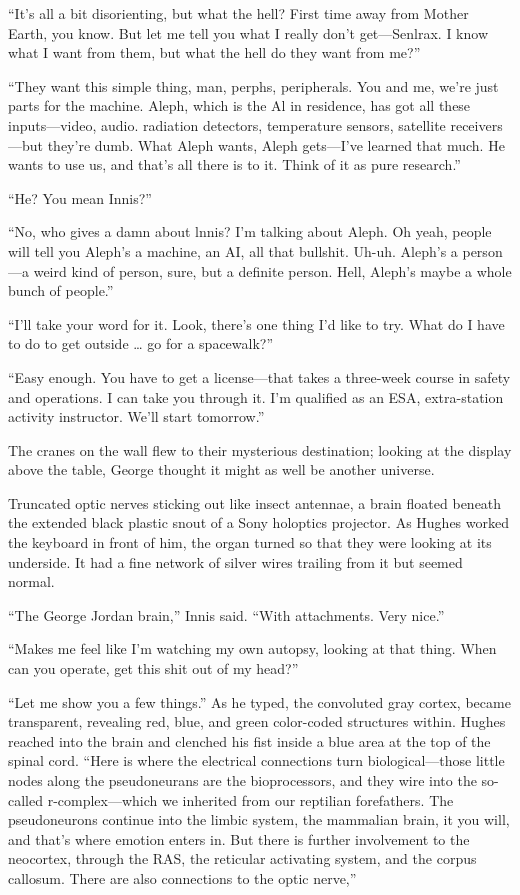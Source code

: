“It’s all a bit disorienting, but what the hell? First time away from Mother Earth, you know. But let me tell you what I really don’t get—Senlrax. I know what I want from them, but what the hell do they want from me?”

“They want this simple thing, man, perphs, peripherals. You and me, we’re just parts for the machine. Aleph, which is the Al in residence, has got all these inputs—video, audio. radiation detectors, temperature sensors, satellite receivers—but they’re dumb. What Aleph wants, Aleph gets—I’ve learned that much. He wants to use us, and that’s all there is to it. Think of it as pure research.”

“He? You mean Innis?”

“No, who gives a damn about lnnis? I’m talking about Aleph. Oh yeah, people will tell you Aleph’s a machine, an AI, all that bullshit. Uh-uh. Aleph’s a person—a weird kind of person, sure, but a definite person. Hell, Aleph’s maybe a whole bunch of people.”

“I’ll take your word for it. Look, there’s one thing I’d like to try. What do I have to do to get outside … go for a spacewalk?”

“Easy enough. You have to get a license—that takes a three-week course in safety and operations. I can take you through it. I’m qualified as an ESA, extra-station activity instructor. We’ll start tomorrow.”

The cranes on the wall flew to their mysterious destination; looking at the display above the table, George thought it might as well be another universe.

Truncated optic nerves sticking out like insect antennae, a brain floated beneath the extended black plastic snout of a Sony holoptics projector. As Hughes worked the keyboard in front of him, the organ turned so that they were looking at its underside. It had a fine network of silver wires trailing from it but seemed normal.

“The George Jordan brain,” Innis said. “With attachments. Very nice.”

“Makes me feel like I’m watching my own autopsy, looking at that thing. When can you operate, get this shit out of my head?”

“Let me show you a few things.” As he typed, the convoluted gray cortex, became transparent, revealing red, blue, and green color-coded structures within. Hughes reached into the brain and clenched his fist inside a blue area at the top of the spinal cord. “Here is where the electrical connections turn biological—those little nodes along the pseudoneurans are the bioprocessors, and they wire into the so-called r-complex—which we inherited from our reptilian forefathers. The pseudoneurons continue into the limbic system, the mammalian brain, it you will, and that’s where emotion enters in. But there is further involvement to the neocortex, through the RAS, the reticular activating system, and the corpus callosum. There are also connections to the optic nerve,”


